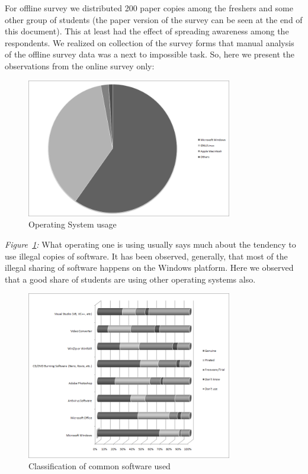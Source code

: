 For offline survey we distributed 200 paper copies among the freshers and some other group of students (the paper version of the survey can be seen at the end of this document). This at least had the effect of spreading awareness among the respondents. We realized on collection of the survey forms that manual analysis of the offline survey data was a next to impossible task. So, here we present the observations from the online survey only:

\begin{figure}[h!]
\centering
\includegraphics[width=0.8\textwidth]{./q1.png}
\caption{Operating System usage}
\label{fig:q1}
\end{figure}

\emph{Figure~\ref{fig:q1}:} What operating one is using usually says much about the tendency to use illegal copies of software. It has been observed, generally, that most of the illegal sharing of software happens on the Windows platform. Here we observed that a good share of students are using other operating systems also.

\newpage
\begin{figure}[h!]
\centering
\includegraphics[width=0.8\textwidth]{./q2.png}
\caption{Classification of common software used}
\label{fig:q2}
\end{figure}

